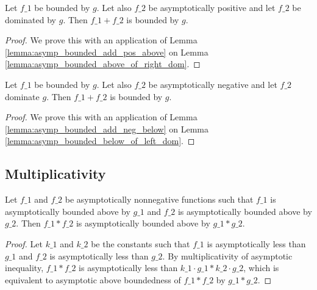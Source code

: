 \begin{lemma}
    \label{lemma:asymp_bounded_add_pos_right_dom}
    \leanok
    Let $f\_1$ be bounded by $g$. Let also $f\_2$ be asymptotically positive and
    let $f\_2$ be dominated by $g$. Then $f\_1 + f\_2$ is bounded by $g$.
\end{lemma}

\begin{proof}
    \leanok
    We prove this with an application of Lemma \ref{lemma:asymp_bounded_add_pos_above}
    on Lemma \ref{lemma:asymp_bounded_above_of_right_dom}.
\end{proof}

\begin{lemma}
    \label{lemma:asymp_bounded_add_neg_left_dom}
    \leanok
    Let $f\_1$ be bounded by $g$. Let also $f\_2$ be asymptotically negative and
    let $f\_2$ dominate $g$. Then $f\_1 + f\_2$ is bounded by $g$.
\end{lemma}

\begin{proof}
    \leanok
    We prove this with an application of Lemma \ref{lemma:asymp_bounded_add_neg_below}
    on Lemma \ref{lemma:asymp_bounded_below_of_left_dom}.
\end{proof}


\subsection{Multiplicativity}

\begin{lemma}
    \label{lemma:asymp_bounded_above_nonneg_mul}
    \leanok
    Let $f\_1$ and $f\_2$ be asymptotically nonnegative functions such that $f\_1$ 
    is asymptotically bounded above by $g\_1$ and $f\_2$ is asymptotically bounded 
    above by $g\_2$. Then $f\_1 * f\_2$ is asymptotically bounded above by $g\_1 * g\_2$.
\end{lemma}

\begin{proof}
    \leanok
    Let $k\_1$ and $k\_2$ be the constants such that $f\_1$ is asymptotically less than
    $g\_1$ and $f\_2$ is asymptotically less than $g\_2$. By multiplicativity of asymptotic 
    inequality, $f\_1 * f\_2$ is asymptotically less than $k\_1 \cdot g\_1 * k\_2 \cdot g\_2$,
    which is equivalent to asymptotic above boundedness of $f\_1 * f\_2$ by $g\_1 * g\_2$.
\end{proof}

